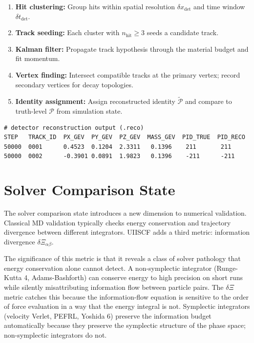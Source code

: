 \documentclass[11pt,a4paper]{article}
\newcommand{\Pid}{\mathscr{P}}
\newcommand{\Rec}{\Xi}
\begin{document}
\begin{enumerate}[leftmargin=1.5em]
  \item \textbf{Hit clustering:} Group hits within spatial resolution
    $\delta x_{\mathrm{det}}$ and time window $\delta t_{\mathrm{det}}$.
  \item \textbf{Track seeding:} Each cluster with $n_{\mathrm{hit}} \geq 3$
    seeds a candidate track.
  \item \textbf{Kalman filter:} Propagate track hypothesis through the
    material budget and fit momentum.
  \item \textbf{Vertex finding:} Intersect compatible tracks at the primary
    vertex; record secondary vertices for decay topologies.
  \item \textbf{Identity assignment:} Assign reconstructed identity
    $\tilde{\Pid}$ and compare to truth-level $\Pid$ from simulation state.
\end{enumerate}

\begin{lstlisting}
# detector reconstruction output (.reco)
STEP   TRACK_ID  PX_GEV  PY_GEV  PZ_GEV  MASS_GEV  PID_TRUE  PID_RECO
50000  0001      0.4523  0.1204  2.3311   0.1396    211       211
50000  0002      -0.3901 0.0891  1.9823   0.1396    -211      -211
\end{lstlisting}

\section{Solver Comparison State}\label{sec:solver}

The solver comparison state introduces a new dimension to numerical
validation.  Classical MD validation typically checks energy conservation
and trajectory divergence between different integrators.  UIISCF adds
a third metric: information divergence $\delta\Rec_{\alpha\beta}$.

The significance of this metric is that it reveals a class of solver pathology
that energy conservation alone cannot detect.  A non-symplectic integrator
(Runge-Kutta 4, Adams-Bashforth) can conserve energy to high precision on
short runs while silently misattributing information flow between particle
pairs.  The $\delta\Rec$ metric catches this because the information-flow
equation is sensitive to the order of force evaluation in a way that the
energy integral is not.  Symplectic integrators (velocity Verlet, PEFRL,
Yoshida 6) preserve the information budget automatically because they preserve
the symplectic structure of the phase space; non-symplectic integrators do not.
\end{document}
